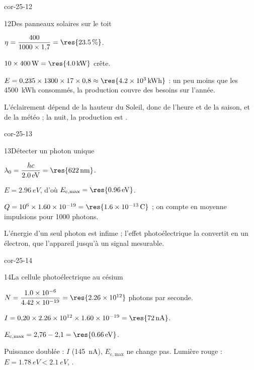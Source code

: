 \begin{blocLivre}{cor-25-12}
\begin{corrige}{12}{Des panneaux solaires sur le toit}
\begin{questions}
\item $\eta=\dfrac{400}{1000\times1{,}7}=\res{\qty{23,5}{\percent}}$.
\item $10\times\qty{400}{W}=\res{\qty{4,0}{kW}}$ crête.
\item $E=0{,}235\times1300\times17\times0{,}8\approx\res{\qty{4,2e3}{kWh}}$ : un peu moins que les \qty{4500}{kWh} consommés, la
production couvre  des besoins sur l'année.
\item L'éclairement dépend de la hauteur du Soleil, donc de l'heure et de la saison, et de la météo ; la nuit, la
production est .
\end{questions}
\end{corrige}
\end{blocLivre}
\begin{blocLivre}{cor-25-13}
\begin{corrige}{13}{Détecter un photon unique}
\begin{questions}
\item $\lambda_0=\dfrac{hc}{\qty{2,0}{eV}}=\res{\qty{622}{nm}}$.
\item $E=\qty{2,96}{eV}$, d'où $E_\mathrm{c,max}=\res{\qty{0,96}{eV}}$.
\item $Q=10^6\times\num{1.60e-19}=\res{\qty{1,6e-13}{C}}$ ; on compte en moyenne  impulsions pour \num{1000} photons.
\item L'énergie d'un seul photon est infime ; l'effet photoélectrique la convertit en un électron, que l'appareil
 jusqu'à un signal mesurable.
\end{questions}
\end{corrige}
\end{blocLivre}
\begin{blocLivre}{cor-25-14}
\begin{corrige}{14}{La cellule photoélectrique au césium}
\begin{questions}
\item $N=\dfrac{\num{1.0e-6}}{\num{4.42e-19}}=\res{\num{2.26e12}}$ photons par seconde.
\item $I=0{,}20\times\num{2.26e12}\times\num{1.60e-19}=\res{\qty{72}{nA}}$.
\item $E_\mathrm{c,max}=2{,}76-2{,}1=\res{\qty{0,66}{eV}}$.
\item Puissance doublée : $I$  (\qty{145}{nA}), $E_\mathrm{c,max}$ ne change pas. Lumière rouge : $E=\qty{1,78}{eV}<\qty{2,1}{eV}$,
.
\end{questions}
\end{corrige}
\end{blocLivre}
